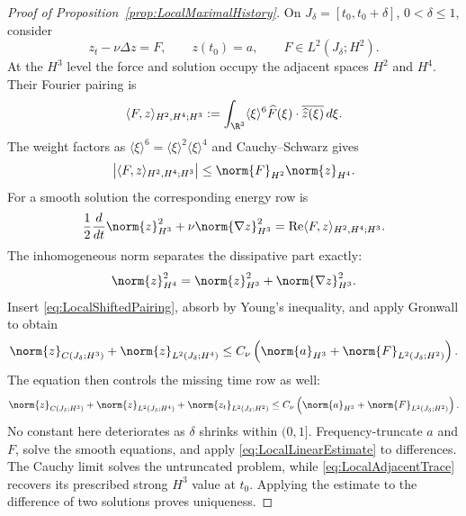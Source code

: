 \begin{proof}[Proof of Proposition~\ref{prop:LocalMaximalHistory}]
On \(J_\delta=[t_0,t_0+\delta]\), \(0<\delta\leq1\), consider
\[
  z_t-\nu\Delta z=F,
  \qquad
  z(t_0)=a,
  \qquad
  F\in L^2(J_\delta;H^2).
\]
At the \(H^3\) level the force and solution occupy the adjacent spaces
\(H^2\) and \(H^4\).  Their Fourier pairing is
\[
  \langle F,z\rangle_{H^2,H^4;H^3}
  :=\int_{\R^3}\langle\xi\rangle^6
       \widehat F(\xi)\cdot\overline{\widehat z(\xi)}\,d\xi.
\]
The weight factors as
\(
  \langle\xi\rangle^6
  =\langle\xi\rangle^2\langle\xi\rangle^4
\)
and Cauchy--Schwarz gives
\begin{equation}
  \left|\langle F,z\rangle_{H^2,H^4;H^3}\right|
  \leq\norm{F}_{H^2}\norm{z}_{H^4}.
  \label{eq:LocalShiftedPairing}
\end{equation}
For a smooth solution the corresponding energy row is
\[
  \frac12\frac d{dt}\norm{z}_{H^3}^2
  +\nu\norm{\nabla z}_{H^3}^2
  =\operatorname{Re}\langle F,z\rangle_{H^2,H^4;H^3}.
\]
The inhomogeneous norm separates the dissipative part exactly:
\[
  \norm{z}_{H^4}^2
  =\norm{z}_{H^3}^2+\norm{\nabla z}_{H^3}^2.
\]
Insert \eqref{eq:LocalShiftedPairing}, absorb by Young’s inequality, and apply
Gronwall to obtain
\[
  \norm{z}_{C(J_\delta;H^3)}
  +\norm{z}_{L^2(J_\delta;H^4)}
  \leq
  C_\nu\left(
    \norm{a}_{H^3}+\norm{F}_{L^2(J_\delta;H^2)}
  \right).
\]
The equation then controls the missing time row as well:
\begin{equation}
  \norm{z}_{C(J_\delta;H^3)}
  +\norm{z}_{L^2(J_\delta;H^4)}
  +\norm{z_t}_{L^2(J_\delta;H^2)}
  \leq
  C_\nu\left(
    \norm{a}_{H^3}+\norm{F}_{L^2(J_\delta;H^2)}
  \right).
  \label{eq:LocalLinearEstimate}
\end{equation}
No constant here deteriorates as \(\delta\) shrinks within \((0,1]\).
Frequency-truncate \(a\) and \(F\), solve the smooth equations, and apply
\eqref{eq:LocalLinearEstimate} to differences.  The Cauchy limit solves the
untruncated problem, while \eqref{eq:LocalAdjacentTrace} recovers its prescribed
strong \(H^3\) value at \(t_0\).  Applying the estimate to the difference of two
solutions proves uniqueness.



\end{proof}
